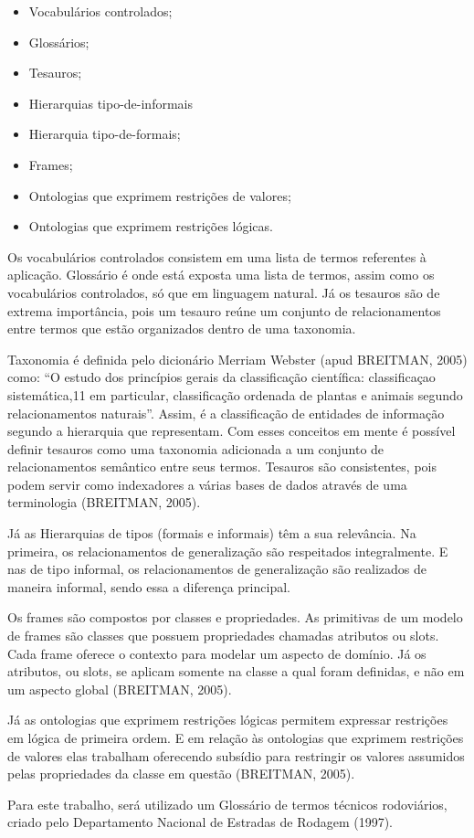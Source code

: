 \begin{itemize}
\item Vocabulários controlados;
\item Glossários;
\item Tesauros;
\item Hierarquias tipo-de-informais
\item Hierarquia tipo-de-formais;
\item Frames;
\item Ontologias que exprimem restrições de valores;
\item Ontologias que exprimem restrições lógicas.
\end{itemize}

Os vocabulários controlados consistem em uma lista de termos referentes à aplicação.
Glossário é onde está exposta uma lista de termos, assim como os vocabulários controlados,
só que em linguagem natural. Já os tesauros são de extrema importância, pois um tesauro
reúne um conjunto de relacionamentos entre termos que estão organizados dentro de uma
taxonomia.

Taxonomia é definida pelo dicionário Merriam Webster (apud BREITMAN, 2005)
como: “O estudo dos princípios gerais da classificação científica: classificaçao sistemática,11
em particular, classificação ordenada de plantas e animais segundo relacionamentos naturais”.
Assim, é a classificação de entidades de informação segundo a hierarquia que representam.
Com esses conceitos em mente é possível definir tesauros como uma taxonomia adicionada a
um conjunto de relacionamentos semântico entre seus termos. Tesauros são consistentes, pois
podem servir como indexadores a várias bases de dados através de uma terminologia
(BREITMAN, 2005).

Já as Hierarquias de tipos (formais e informais) têm a sua relevância. Na primeira, os
relacionamentos de generalização são respeitados integralmente. E nas de tipo informal, os
relacionamentos de generalização são realizados de maneira informal, sendo essa a diferença
principal.

Os frames são compostos por classes e propriedades. As primitivas de um modelo de
frames são classes que possuem propriedades chamadas atributos ou slots. Cada frame oferece
o contexto para modelar um aspecto de domínio. Já os atributos, ou slots, se aplicam somente
na classe a qual foram definidas, e não em um aspecto global (BREITMAN, 2005).

Já as ontologias que exprimem restrições lógicas permitem expressar restrições em
lógica de primeira ordem. E em relação às ontologias que exprimem restrições de valores elas
trabalham oferecendo subsídio para restringir os valores assumidos pelas propriedades da
classe em questão (BREITMAN, 2005).

Para este trabalho, será utilizado um Glossário de termos técnicos rodoviários, criado
pelo Departamento Nacional de Estradas de Rodagem (1997).

